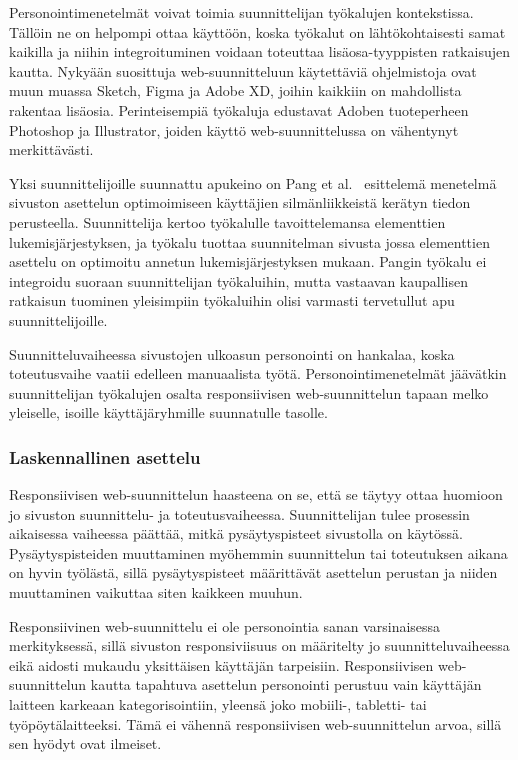 \documentclass[finnish, 12pt, a4paper, elec, utf8, a-1b, online]{aaltothesis}
\begin{document}
Personointimenetelmät voivat toimia suunnittelijan työkalujen kontekstissa.
Tällöin ne on helpompi ottaa käyttöön, koska työkalut on lähtökohtaisesti samat
kaikilla ja niihin integroituminen voidaan toteuttaa lisäosa-tyyppisten
ratkaisujen kautta. Nykyään suosittuja web-suunnitteluun käytettäviä
ohjelmistoja ovat muun muassa Sketch, Figma ja Adobe XD, joihin kaikkiin on
mahdollista rakentaa lisäosia. Perinteisempiä työkaluja edustavat Adoben
tuoteperheen Photoshop ja Illustrator, joiden käyttö web-suunnittelussa on
vähentynyt merkittävästi.

Yksi suunnittelijoille suunnattu apukeino on Pang et al.~\cite{10.1145/2980179.2982422}
esittelemä menetelmä sivuston asettelun optimoimiseen käyttäjien
silmänliikkeistä kerätyn tiedon perusteella. Suunnittelija kertoo työkalulle
tavoittelemansa elementtien lukemisjärjestyksen, ja työkalu tuottaa suunnitelman
sivusta jossa elementtien asettelu on optimoitu annetun lukemisjärjestyksen
mukaan. Pangin työkalu ei integroidu suoraan suunnittelijan työkaluihin, mutta
vastaavan kaupallisen ratkaisun tuominen yleisimpiin työkaluihin olisi varmasti
tervetullut apu suunnittelijoille.

Suunnitteluvaiheessa sivustojen ulkoasun personointi on hankalaa, koska
toteutusvaihe vaatii edelleen manuaalista työtä. Personointimenetelmät jäävätkin
suunnittelijan työkalujen osalta responsiivisen web-suunnittelun tapaan melko
yleiselle, isoille käyttäjäryhmille suunnatulle tasolle.

\subsubsection{Laskennallinen asettelu}

Responsiivisen web-suunnittelun haasteena on se, että se täytyy ottaa huomioon
jo sivuston suunnittelu- ja toteutusvaiheessa. Suunnittelijan tulee prosessin
aikaisessa vaiheessa päättää, mitkä pysäytyspisteet sivustolla on käytössä.
Pysäytyspisteiden muuttaminen myöhemmin suunnittelun tai toteutuksen aikana on
hyvin työlästä, sillä pysäytyspisteet määrittävät asettelun perustan ja niiden
muuttaminen vaikuttaa siten kaikkeen muuhun.

Responsiivinen web-suunnittelu ei ole personointia sanan varsinaisessa
merkityksessä, sillä sivuston responsiviisuus on määritelty jo
suunnitteluvaiheessa eikä aidosti mukaudu yksittäisen käyttäjän tarpeisiin.
Responsiivisen web-suunnittelun kautta tapahtuva asettelun personointi perustuu
vain käyttäjän laitteen karkeaan kategorisointiin, yleensä joko mobiili-,
tabletti- tai työpöytälaitteeksi. Tämä ei vähennä responsiivisen
web-suunnittelun arvoa, sillä sen hyödyt ovat ilmeiset.
\end{document}
